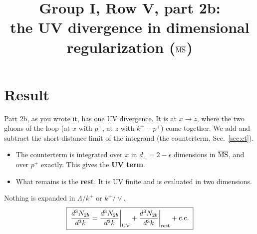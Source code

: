 \documentclass[10pt]{article}
\title{Group I, Row V, part 2b:\\ the UV divergence in dimensional regularization ($\overline{\rm MS}$)}
\date{}
\numberwithin{equation}{section}
\begin{document}
\maketitle
\tableofcontents

\section{Result}\label{sec:result}
Part 2b, as you wrote it, has one UV divergence. It is at $x\to z$, where the two gluons of the loop (at $x$ with $p^+$, at $z$ with $k^+-p^+$) come together. We add and subtract the short-distance limit of the integrand (the counterterm, Sec.~\ref{sec:ct}).
\begin{itemize}
\item The counterterm is integrated over $x$ in $d_\perp=2-\epsilon$ dimensions in $\overline{\rm MS}$, and over $p^+$ exactly. This gives the \textbf{UV term}.
\item What remains is the \textbf{rest}. It is UV finite and is evaluated in two dimensions.
\end{itemize}
Nothing is expanded in $\Lambda/k^+$ or $k^+/\vee$.
\begin{equation}
\boxed{\;\frac{d^{3}N_{2b}}{d^{3}k}=\frac{d^{3}N_{2b}}{d^{3}k}\bigg|_{\rm UV}+\frac{d^{3}N_{2b}}{d^{3}k}\bigg|_{\rm rest}+{\rm c.c.}\;}
\label{eq:split}
\end{equation}
\end{document}
